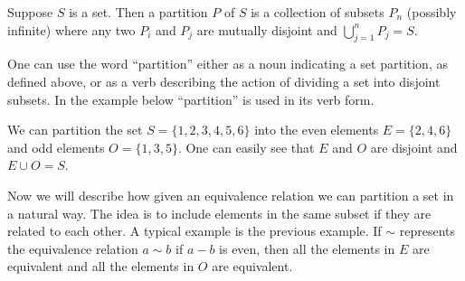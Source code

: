 \begin{definition}
Suppose $S$ is a set. Then a partition $P$ of $S$ is a collection of subsets $P_n$ (possibly infinite) where any two $P_i$ and $P_j$ are mutually disjoint and $\bigcup_{j = 1}^nP_j = S$. 
\end{definition}

One can use the word ``partition'' either as a noun indicating a set partition, as defined above, or as a verb describing the action of dividing a set into disjoint subsets. In the example below ``partition'' is used in its verb form.

\begin{example}
We can partition the set $S = \{1, 2, 3, 4, 5, 6\}$ into the even elements $E = \{2, 4, 6\}$ and odd elements $O = \{1, 3, 5\}$. One can easily see that $E$ and $O$ are disjoint and $E \cup O = S$.
\end{example}

Now we will describe how given an equivalence relation we can partition a set in a natural way. The idea is to include elements in the same subset if they are related to each other. A typical example is the previous example. If $\sim$ represents the equivalence relation $a \sim b$ if $a - b$ is even, then all the elements in $E$ are equivalent and all the elements in $O$ are equivalent. 